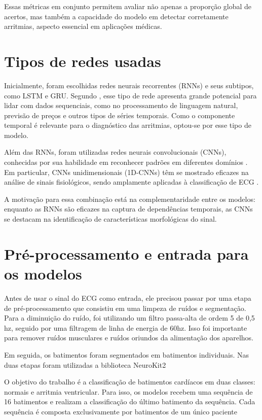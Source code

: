 Essas métricas em conjunto permitem avaliar não apenas a proporção global de acertos, mas também a capacidade do modelo em detectar corretamente arritmias, aspecto essencial em aplicações médicas.

\section{Tipos de redes usadas}
\label{sec:tipo_redes}

Inicialmente, foram escolhidas redes neurais recorrentes (RNNs) e seus subtipos, como LSTM e GRU. Segundo , esse tipo de rede apresenta grande potencial para lidar com dados sequenciais, como no processamento de linguagem natural, previsão de preços e outros tipos de séries temporais. Como o componente temporal é relevante para o diagnóstico das arritmias, optou-se por esse tipo de modelo.

Além das RNNs, foram utilizadas redes neurais convolucionais (CNNs), conhecidas por sua habilidade em reconhecer padrões em diferentes domínios . Em particular, CNNs unidimensionais (1D-CNNs) têm se mostrado eficazes na análise de sinais fisiológicos, sendo amplamente aplicadas à classificação de ECG \cite{narotamo2024}.

A motivação para essa combinação está na complementaridade entre os modelos: enquanto as RNNs são eficazes na captura de dependências temporais, as CNNs se destacam na identificação de características morfológicas do sinal.

\section{Pré-processamento e entrada para os modelos}
\label{sec:pre_process}

Antes de usar o sinal do ECG como entrada, ele precisou passar por uma etapa de pré-processamento que consistiu em uma limpeza de ruídos e segmentação.
Para a diminuição do ruído, foi utilizando um filtro passa-alta de ordem 5 de 0,5 hz, seguido por uma filtragem de linha de energia de 60hz. 
Isso foi importante para remover ruídos musculares e ruídos oriundos da alimentação dos aparelhos. 

Em seguida, os batimentos foram segmentados em batimentos individuais. Nas duas etapas foram utilizadas a biblioteca NeuroKit2 \cite{Makowski2021neurokit}

O objetivo do trabalho é a classificação de batimentos cardíacos em duas classes: normais e arritmia ventricular. 
Para isso, os modelos recebem uma sequência de 16 batimentos e realizam a classificação do último batimento da sequência. 
Cada sequência é composta exclusivamente por batimentos de um único paciente

